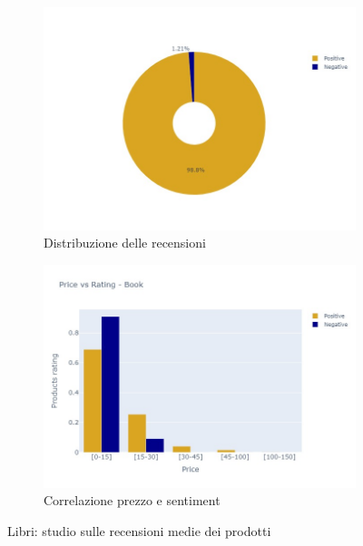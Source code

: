 			\begin{figure} [h]
				\centering
				\begin{subfigure}{0.48\textwidth}
					\includegraphics[width=\textwidth]{Figure/pie_books}
					\caption{Distribuzione delle recensioni}
					\label{fig:pie_books}
				\end{subfigure}
				\begin{subfigure}{0.48\textwidth}
					\includegraphics[width=\textwidth]{Figure/priceVSrating_books}
					\caption{Correlazione prezzo e sentiment}
					\label{fig:priceVSrating_books}
				\end{subfigure}
				\caption{Libri: studio sulle recensioni medie dei prodotti}\label{fig:price_raiting_book}
			\end{figure}
		
